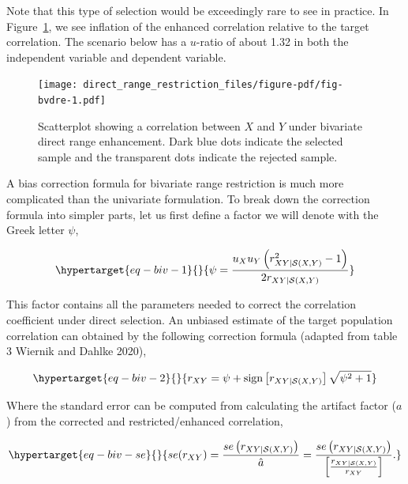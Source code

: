 \documentclass[
  letterpaper,
  DIV=11,
  numbers=noendperiod]{scrreprt}
\begin{document}
Note that this type of selection would be exceedingly rare to see in
practice. In Figure~\ref{fig-bvdre}, we see inflation of the enhanced
correlation relative to the target correlation. The scenario below has a
\(u\)-ratio of about 1.32 in both the independent variable and dependent
variable.

\begin{figure}[H]

{\centering \texttt{[image: direct\_range\_restriction\_files/figure-pdf/fig-bvdre-1.pdf]}

}

\caption{\label{fig-bvdre}Scatterplot showing a correlation between
\(X\) and \(Y\) under bivariate direct range enhancement. Dark blue dots
indicate the selected sample and the transparent dots indicate the
rejected sample.}

\end{figure}

A bias correction formula for bivariate range restriction is much more
complicated than the univariate formulation. To break down the
correction formula into simpler parts, let us first define a factor we
will denote with the Greek letter \(\psi\),

\begin{equation}\protect\hypertarget{eq-biv-1}{}{
\psi = \frac{u_X u_Y\left(r_{XY|\mathcal{S}(X,Y)}^2-1\right)}{2r_{XY|\mathcal{S}(X,Y)}}
}\label{eq-biv-1}\end{equation}

This factor contains all the parameters needed to correct the
correlation coefficient under direct selection. An unbiased estimate of
the target population correlation can obtained by the following
correction formula (adapted from table 3 Wiernik and Dahlke 2020),

\begin{equation}\protect\hypertarget{eq-biv-2}{}{
r_{XY} = \psi + \text{sign}\left[r_{XY|\mathcal{S}(X,Y)}\right]\sqrt{\psi^2+1}
}\label{eq-biv-2}\end{equation}

Where the standard error can be computed from calculating the artifact
factor (\(a\)) from the corrected and restricted/enhanced correlation,

\begin{equation}\protect\hypertarget{eq-biv-se}{}{
se(r_{XY}) = \frac{se\left(r_{XY|\mathcal{S}(X,Y)}\right)}{\hat{a}}= \frac{se\left(r_{XY|\mathcal{S}(X,Y)}\right)}{\left[\frac{r_{XY|\mathcal{S}(X,Y)}}{r_{XY}}\right]}.
}\label{eq-biv-se}\end{equation}
\end{document}
